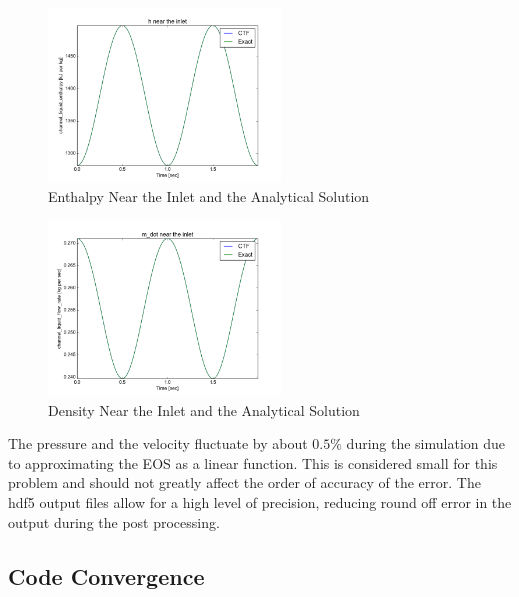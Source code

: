 \documentclass{mc2015}
\begin{document}
\begin{figure}[!h]
	\centering
	\includegraphics[width=0.55\textwidth]{images/Code_Verification/run_00_00/residual/results/Inlet_h}
	\caption{Enthalpy Near the Inlet and the Analytical Solution}
	\label{fig:Inlet_h}
\end{figure}

\begin{figure}[!h]
	\centering
	\includegraphics[width=0.55\textwidth]{images/Code_Verification/run_00_00/residual/results/Inlet_m_dot}
	\caption{Density Near the Inlet and the Analytical Solution}
	\label{fig:Inlet_m_dot}
\end{figure}

 The pressure and the velocity fluctuate by about $0.5\%$ during the simulation
 due to approximating the EOS as a linear function. This is considered small for
 this problem and should not greatly affect the order of accuracy of the error. 
 The hdf5 output files allow for a high level of precision, reducing
 round off error in the output during the post processing.

\subsection{Code Convergence}
\end{document}
